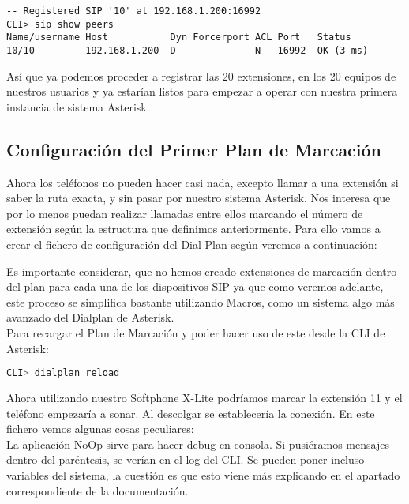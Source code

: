 \begin{lstlisting}[style=consola]
-- Registered SIP '10' at 192.168.1.200:16992
CLI> sip show peers
Name/username Host           Dyn Forcerport ACL Port   Status
10/10         192.168.1.200  D              N   16992  OK (3 ms)
\end{lstlisting}

Así que ya podemos proceder a registrar las 20 extensiones, en los 20 equipos de nuestros usuarios y ya estarían listos para empezar a operar con nuestra primera instancia de sistema Asterisk.

\subsection{Configuración del Primer Plan de Marcación}

Ahora los teléfonos no pueden hacer casi nada, excepto llamar a una extensión si saber la ruta exacta, y sin pasar por nuestro sistema Asterisk. Nos interesa que por lo menos puedan realizar llamadas entre ellos marcando el número de extensión según la estructura que definimos anteriormente. Para ello vamos a crear el fichero de configuración del Dial Plan según veremos a continuación:



Es importante considerar, que no hemos creado extensiones de marcación dentro del plan para cada una de los dispositivos SIP ya que como veremos adelante, este proceso se simplifica bastante utilizando Macros, como un sistema algo más avanzado del Dialplan de Asterisk.\\

Para recargar el Plan de Marcación y poder hacer uso de este desde la CLI de Asterisk:

\begin{lstlisting}[language=sh]
CLI> dialplan reload
\end{lstlisting}

Ahora utilizando nuestro Softphone X-Lite podríamos marcar la extensión 11 y el teléfono empezaría a sonar. Al descolgar se establecería la conexión. En este fichero vemos algunas cosas peculiares:\\

La aplicación NoOp sirve para hacer debug en consola. Si pusiéramos mensajes dentro del paréntesis, se verían en el log del CLI. Se pueden poner incluso variables del sistema, la cuestión es que esto viene más explicando en el apartado correspondiente de la documentación.\\

